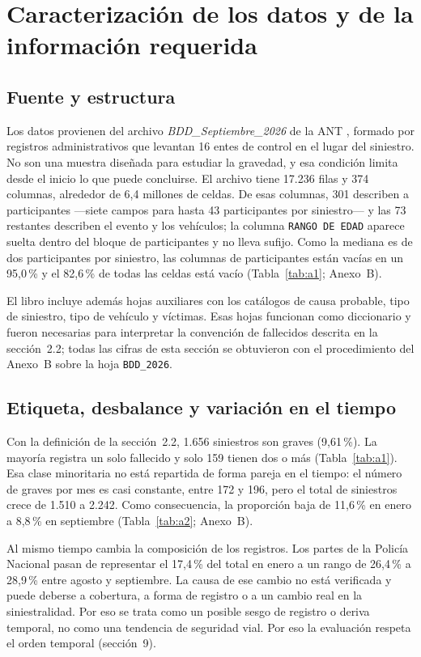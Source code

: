 \section{Caracterización de los datos y de la información requerida}

\subsection{Fuente y estructura}

Los datos provienen del archivo \emph{BDD\_Septiembre\_2026} de la ANT \cite{ref2}, formado por registros administrativos que levantan 16 entes de control en el lugar del siniestro. No son una muestra diseñada para estudiar la gravedad, y esa condición limita desde el inicio lo que puede concluirse. El archivo tiene 17.236 filas y 374 columnas, alrededor de 6,4 millones de celdas. De esas columnas, 301 describen a participantes ---siete campos para hasta 43 participantes por siniestro--- y las 73 restantes describen el evento y los vehículos; la columna \texttt{RANGO DE EDAD} aparece suelta dentro del bloque de participantes y no lleva sufijo. Como la mediana es de dos participantes por siniestro, las columnas de participantes están vacías en un 95,0\,\% y el 82,6\,\% de todas las celdas está vacío (Tabla~\ref{tab:a1}; Anexo~B).

El libro incluye además hojas auxiliares con los catálogos de causa probable, tipo de siniestro, tipo de vehículo y víctimas. Esas hojas funcionan como diccionario y fueron necesarias para interpretar la convención de fallecidos descrita en la sección~2.2; todas las cifras de esta sección se obtuvieron con el procedimiento del Anexo~B sobre la hoja \texttt{BDD\_2026}.

\subsection{Etiqueta, desbalance y variación en el tiempo}

Con la definición de la sección~2.2, 1.656 siniestros son graves (9,61\,\%). La mayoría registra un solo fallecido y solo 159 tienen dos o más (Tabla~\ref{tab:a1}). Esa clase minoritaria no está repartida de forma pareja en el tiempo: el número de graves por mes es casi constante, entre 172 y 196, pero el total de siniestros crece de 1.510 a 2.242. Como consecuencia, la proporción baja de 11,6\,\% en enero a 8,8\,\% en septiembre (Tabla~\ref{tab:a2}; Anexo~B).

Al mismo tiempo cambia la composición de los registros. Los partes de la Policía Nacional pasan de representar el 17,4\,\% del total en enero a un rango de 26,4\,\% a 28,9\,\% entre agosto y septiembre. La causa de ese cambio no está verificada y puede deberse a cobertura, a forma de registro o a un cambio real en la siniestralidad. Por eso se trata como un posible sesgo de registro o deriva temporal, no como una tendencia de seguridad vial. Por eso la evaluación respeta el orden temporal (sección~9).

